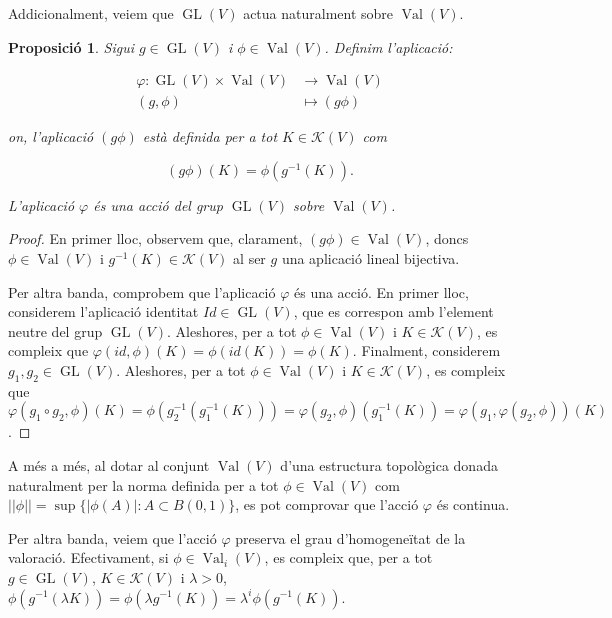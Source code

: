 \documentclass{article}
\newtheorem{proposicio}{Proposici\'{o}}
\theoremstyle{definition}
\DeclareMathOperator{\Val}{Val}
\DeclareMathOperator{\GL}{GL}
\begin{document}
Addicionalment, veiem que $\GL(V)$ actua naturalment sobre $\Val(V)$.

\begin{proposicio}\label{prop:accio}
Sigui $g \in \GL(V)$ i $\phi \in \Val(V)$. Definim l'aplicaci\'{o}:

\begin{align*}
\varphi: \GL(V) \times \Val(V) &\longrightarrow \Val(V)\\
(g, \phi)&\longmapsto (g \phi)
\end{align*}

on, l'aplicaci\'{o} $(g \phi)$ est\`{a} definida per a tot $K \in \mathcal{K}(V)$ com

\[ (g \phi) (K) = \phi(g^{-1} (K)).\]

L'aplicaci\'{o} $\varphi$ \'{e}s una acci\'{o} del grup $\GL(V)$ sobre $\Val(V)$.
\end{proposicio}

\begin{proof}

En primer lloc, observem que, clarament, $(g \phi) \in \Val(V)$, doncs $\phi \in \Val(V)$ i $g^{-1}(K) \in \mathcal{K}(V)$ al ser $g$ una aplicaci\'{o} lineal bijectiva.

Per altra banda, comprobem que l'aplicaci\'{o} $\varphi$ \'{e}s una acci\'{o}. En primer lloc, considerem l'aplicaci\'{o} identitat $Id \in \GL(V)$, que es correspon amb l'element neutre del grup $\GL(V)$. Aleshores, per a tot $\phi \in \Val(V)$ i $K \in \mathcal{K}(V)$, es compleix que $\varphi(id, \phi) (K) = \phi (id (K)) = \phi (K)$. Finalment, considerem $g_1, g_2 \in \GL(V)$. Aleshores, per a tot $\phi \in \Val(V)$ i $K \in \mathcal{K}(V)$, es compleix que $\varphi(g_1 \circ g_2, \phi) (K) = \phi(g_2^{-1} (g_1^{-1} (K))) = \varphi(g_2, \phi) (g_1^{-1} (K)) = \varphi (g_1, \varphi(g_2, \phi)) (K)$.
\end{proof}

A m\'{e}s a m\'{e}s, al dotar al conjunt $\Val(V)$ d'una estructura topol\`{o}gica donada naturalment per la norma definida per a tot $\phi \in \Val(V)$ com $|| \phi || = \sup \{ |\phi(A)|: A \subset B(0,1)\}$, es pot comprovar que l'acci\'{o} $\varphi$ \'{e}s continua.

Per altra banda, veiem que l'acci\'{o} $\varphi$ preserva el grau d'homogene\"{i}tat de la valoraci\'{o}. Efectivament, si $\phi \in \Val_i(V)$, es compleix que, per a tot $g \in \GL(V)$, $K \in \mathcal{K}(V)$ i $\lambda > 0$, $\phi(g^{-1}(\lambda K)) = \phi(\lambda g^{-1}(K)) = \lambda^i \phi(g^{-1} (K))$.
\end{document}

